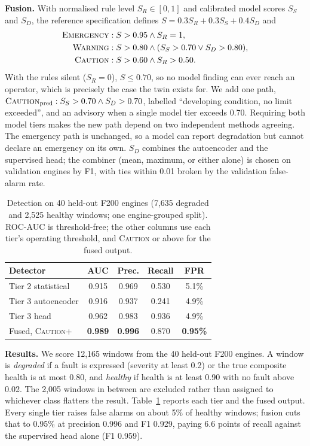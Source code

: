 \noindent\textbf{Fusion.} With normalised rule level $S_R \in [0,1]$ and calibrated model scores $S_S$ and $S_D$, the reference specification defines $S = 0.3S_R + 0.3S_S + 0.4S_D$ and
\begin{align*}
\textsc{Emergency} &: S > 0.95 \wedge S_R = 1,\\
\textsc{Warning} &: S > 0.80 \wedge (S_S > 0.70 \vee S_D > 0.80),\\
\textsc{Caution} &: S > 0.60 \wedge S_R > 0.50.
\end{align*}
With the rules silent ($S_R = 0$), $S \le 0.70$, so no model finding can ever reach an operator, which is precisely the case the twin exists for. We add one path, $\textsc{Caution}_{\mathrm{pred}}: S_S > 0.70 \wedge S_D > 0.70$, labelled ``developing condition, no limit exceeded'', and an advisory when a single model tier exceeds 0.70. Requiring both model tiers makes the new path depend on two independent methods agreeing. The emergency path is unchanged, so a model can report degradation but cannot declare an emergency on its own. $S_D$ combines the autoencoder and the supervised head; the combiner (mean, maximum, or either alone) is chosen on validation engines by F1, with ties within 0.01 broken by the validation false-alarm rate.

\begin{table}[t]
\centering
\small
\begin{tabular}{@{}lcccc@{}}
\toprule
Detector & AUC & Prec. & Recall & FPR \\
\midrule
Tier 2 statistical & 0.915 & 0.969 & 0.530 & 5.1\% \\
Tier 3 autoencoder & 0.916 & 0.937 & 0.241 & 4.9\% \\
Tier 3 head & 0.962 & 0.983 & 0.936 & 4.9\% \\
Fused, \textsc{Caution}+ & \textbf{0.989} & \textbf{0.996} & 0.870 & \textbf{0.95\%} \\
\bottomrule
\end{tabular}
\caption{Detection on 40 held-out F200 engines (7,635 degraded and 2,525 healthy windows; one engine-grouped split). ROC-AUC is threshold-free; the other columns use each tier's operating threshold, and \textsc{Caution} or above for the fused output.}
\label{tab:det}
\end{table}

\noindent\textbf{Results.} We score 12,165 windows from the 40 held-out F200 engines. A window is \emph{degraded} if a fault is expressed (severity at least 0.2) or the true composite health is at most 0.80, and \emph{healthy} if health is at least 0.90 with no fault above 0.02. The 2,005 windows in between are excluded rather than assigned to whichever class flatters the result. Table~\ref{tab:det} reports each tier and the fused output. Every single tier raises false alarms on about 5\% of healthy windows; fusion cuts that to 0.95\% at precision 0.996 and F1 0.929, paying 6.6 points of recall against the supervised head alone (F1 0.959).

